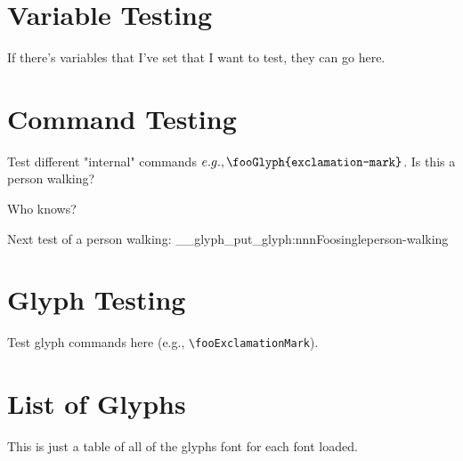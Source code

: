 \documentclass[letterpaper]{article}
\begin{document}
\section{Variable Testing}
If there's variables that I've set that I want to test, they can go here.\par

\section{Command Testing}
Test different "internal" commands \(e.g., \verb|\fooGlyph{exclamation-mark}|\).
Is this a person walking? 
{
}

Who knows?\par

Next test of a person walking: 
\ExplSyntaxOn
\__glyph_put_glyph:nnn{Foo}{single}{person-walking}
\ExplSyntaxOff

\section{Glyph Testing}
Test glyph commands here (e.g., \verb|\fooExclamationMark|).


\pagebreak
\section{List of Glyphs}
This is just a table of all of the glyphs font for each font loaded.
\end{document}

